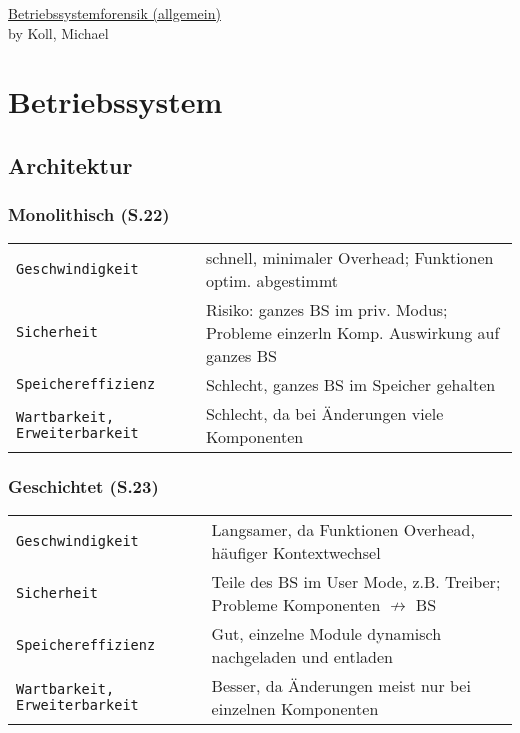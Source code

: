 \raggedright
\footnotesize
\begin{multicols}{3}	
	\setlength{\premulticols}{1pt}
	\setlength{\postmulticols}{1pt}
	\setlength{\multicolsep}{1pt}
	\setlength{\columnsep}{2pt}

\begin{center}
     \Large{\underline{Betriebssystemforensik (allgemein)}} \\
     \small by Koll, Michael\\
\end{center}

\section{Betriebssystem}
\subsection{Architektur}
\subsubsection{Monolithisch (S.22)}
\begin{tabular}{@{}p{\the\MyLen}%
		@{}p{\linewidth-\the\MyLen}@{}}
	\texttt{Geschwindigkeit} & schnell, minimaler Overhead; Funktionen optim. abgestimmt\\
	\texttt{Sicherheit} & Risiko: ganzes BS im priv. Modus; Probleme einzerln Komp. Auswirkung auf ganzes BS\\
	\texttt{Speichereffizienz} & Schlecht, ganzes BS im Speicher gehalten\\
	\texttt{Wartbarkeit, Erweiterbarkeit} & Schlecht, da bei Änderungen viele Komponenten\\
\end{tabular}

\subsubsection{Geschichtet (S.23)}
\begin{tabular}{@{}p{\the\MyLen}%
		@{}p{\linewidth-\the\MyLen}@{}}
	\texttt{Geschwindigkeit} & Langsamer, da Funktionen Overhead, häufiger Kontextwechsel\\
	\texttt{Sicherheit} & Teile des BS im User Mode, z.B. Treiber; Probleme Komponenten $\nrightarrow$ BS\\
	\texttt{Speichereffizienz} & Gut, einzelne Module dynamisch nachgeladen und entladen\\
	\texttt{Wartbarkeit, Erweiterbarkeit} & Besser, da Änderungen meist nur bei einzelnen Komponenten\\
\end{tabular}


\end{multicols}

